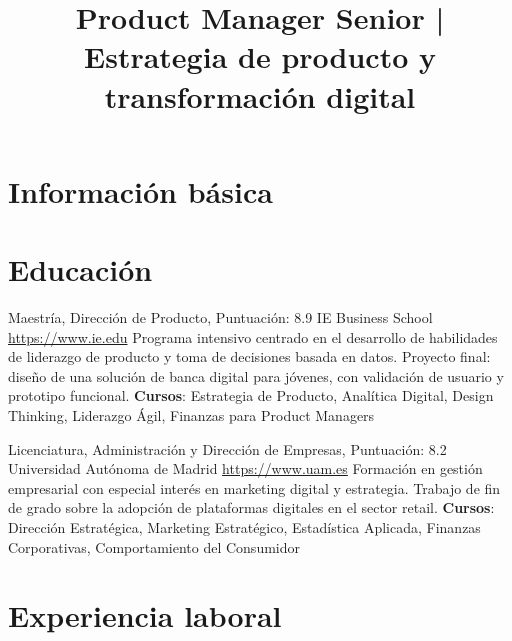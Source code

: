 \documentclass[a4paper, serif, 10pt]{moderncv}
\title{Product Manager Senior | Estrategia de producto y transformación digital}
\begin{document}
\maketitle

\section{Información básica}

\section{Educación}

        {Maestría, Dirección de Producto, Puntuación: 8.9}
        {IE Business School}
        {\url{https://www.ie.edu}}
        {}
        {Programa intensivo centrado en el desarrollo de habilidades de liderazgo de producto y toma de decisiones basada en datos.
Proyecto final: diseño de una solución de banca digital para jóvenes, con validación de usuario y prototipo funcional.
\textbf{Cursos}: Estrategia de Producto, Analítica Digital, Design Thinking, Liderazgo Ágil, Finanzas para Product Managers}

        {Licenciatura, Administración y Dirección de Empresas, Puntuación: 8.2}
        {Universidad Autónoma de Madrid}
        {\url{https://www.uam.es}}
        {}
        {Formación en gestión empresarial con especial interés en marketing digital y estrategia.
Trabajo de fin de grado sobre la adopción de plataformas digitales en el sector retail.
\textbf{Cursos}: Dirección Estratégica, Marketing Estratégico, Estadística Aplicada, Finanzas Corporativas, Comportamiento del Consumidor}
\section{Experiencia laboral}
\end{document}
